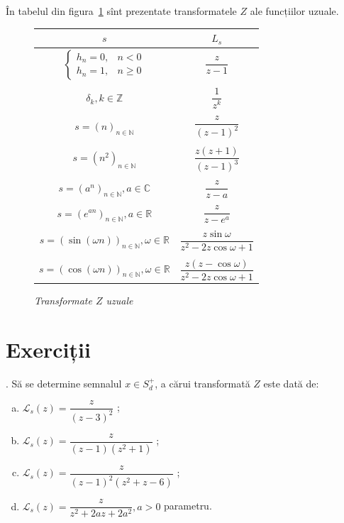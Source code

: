 \documentclass[12pt,a4paper]{article}
\newcommand\NN{\mathbb{N}}
\newcommand\RR{\mathbb{R}}
\newcommand\ZZ{\mathbb{Z}}
\newcommand\CC{\mathbb{C}}
\newcommand\Lap{\mathcal{L}}
\theoremstyle{dotless}
\theoremstyle{dotlessdr}
\begin{document}
În tabelul din figura~\ref{fig:transf-z} sînt prezentate transformatele $ Z $ ale funcțiilor
uzuale.

\begin{figure}[!htbp]
  \centering
  \begin{tabular}{c | c}
    $ s $ & $ L_s $ \\
    \hline\hline
    $ \begin{cases}
      h_n = 0, & n < 0 \\
      h_n = 1, & n \geq 0
    \end{cases} $ & $ \dfrac{z}{z - 1} $ \\
          & \\
    $ \delta_k, k \in \ZZ $ & $ \dfrac{1}{z^k} $ \\
          &\\
    $ s = (n)_{n \in \NN} $ & $ \dfrac{z}{(z - 1)^2} $ \\
          &\\
    $ s = (n^2)_{n \in \NN} $ & $ \dfrac{z(z+1)}{(z - 1)^3} $ \\
          &\\
    $ s = (a^n)_{n \in \NN}, a \in \CC $ & $ \dfrac{z}{z - a} $ \\
          &\\
    $ s = (e^{an})_{n \in \NN}, a \in \RR $ & $ \dfrac{z}{z - e^a} $ \\
          &\\
    $ s = (\sin(\omega n))_{n \in \NN}, \omega \in \RR $ & $ \dfrac{z \sin \omega}{z^2 - 2z \cos \omega + 1} $ \\
          &\\
    $ s = (\cos(\omega n))_{n \in \NN}, \omega \in \RR $ & $ \dfrac{z(z - \cos \omega)}{z^2 - 2z \cos \omega + 1} $
  \end{tabular}
  \caption{\emph{Transformate $ Z $ uzuale}}\label{fig:transf-z}
\end{figure}


\section*{Exerciții}

\indent{}. Să se determine semnalul $x \in S_d^+$, a cărui transformată $Z$ este 
dată de:
\begin{enumerate}[(a)]
\item $\Lap_s (z) = \dfrac{z}{(z-3)^2}$ ;
\item $\Lap_s (z) = \dfrac{z}{(z-1)(z^2 + 1)}$ ;
\item $\Lap_s (z) = \dfrac{z}{(z-1)^2(z^2 + z - 6)}$ ;
\item $\Lap_s (z) = \dfrac{z}{z^2 + 2az + 2a^2}, a > 0$ parametru.
\end{enumerate}
\end{document}
